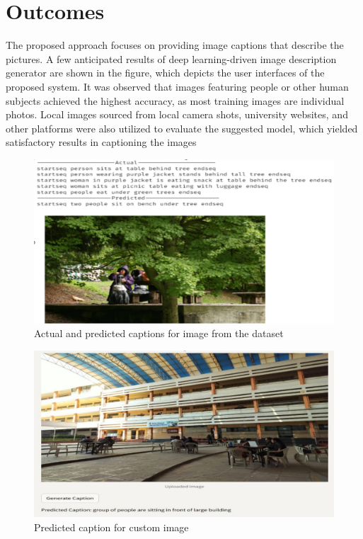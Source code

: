 \documentclass[oneside,a4paper,12pt]{report}
\begin{document}
\section{Outcomes}
The proposed approach focuses on providing image captions that describe the pictures. A few anticipated results of deep learning-driven image description generator are shown in the figure, which depicts the user interfaces of the proposed system. It was observed that images featuring people or other human subjects achieved the highest accuracy, as most training images are individual photos. Local images sourced from local camera shots, university websites, and other platforms were also utilized to evaluate the suggested model, which yielded satisfactory results in captioning the images
\begin{figure}[H]
\begin{center}
\includegraphics[width=0.9\linewidth]{result1}
\caption{Actual and predicted captions for image from the dataset}
\label{Fig:f2}
\end{center}
\end{figure}
\begin{figure}[H]
\begin{center}
\includegraphics[width=0.8\linewidth]{result2}
\caption{Predicted caption for custom image}
\label{Fig:f2}
\end{center}
\end{figure}
\end{document}
